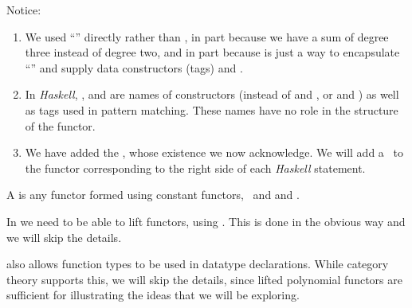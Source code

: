 Notice:
\begin{enumerate}
\item We used ``\tc{|}'' directly rather than , in part because we
have a sum of degree three instead of degree two, and in part because
is just a way to encapsulate ``\tc{|}'' and supply data constructors (tags)
 and .
\item In \textit{Haskell}, ,  and  are names of
constructors (instead of  and , or  and )
as well as tags used in pattern matching.  These names have no role in the
structure of the functor.
\item We have added the \bottom, whose existence we now acknowledge.  We will
add a \bottom \, to the functor corresponding to the right side of each
\textit{Haskell}  statement. 
\end{enumerate}

\newslide

A  is any functor formed using constant functors,
\Id \, and \tm{+} and \tm{\times}.

\vs

In \Has we need to be able to lift functors, using \bottom.  This is done
in the obvious way and we will skip the details.

\vs

\Has also allows function types to be used in datatype declarations.  While
category theory supports this, we will skip the details, since lifted
polynomial functors are sufficient for illustrating the ideas that we will
be exploring.